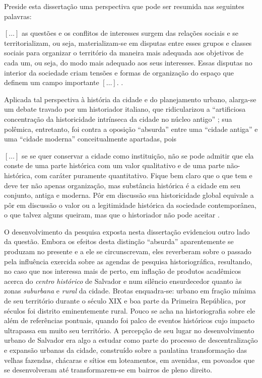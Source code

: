 Preside esta dissertação uma perspectiva que pode ser resumida nas seguintes palavras:

\begin{citacao}
\([\dots]\) as questões e os conflitos de interesses surgem das relações sociais e se territorializam, ou seja, materializam-se em disputas entre esses grupos e classes sociais para organizar o território da maneira mais adequada aos objetivos de cada um, ou seja, do modo mais adequado aos seus interesses. Essas disputas no interior da sociedade criam tensões e formas de organização do espaço que definem um campo importante \([\dots]\). \cite[p.~41]{CASTRO2005}.
\end{citacao}

Aplicada tal perspectiva à história da cidade e do planejamento urbano, alarga-se um debate travado por um historiador italiano, que ridicularizou a ``artificiosa concentração da historicidade intrínseca da cidade no núcleo antigo'' \cite[p.~74]{argan_histcid_1992}; sua polêmica, entretanto, foi contra a oposição ``absurda'' entre uma ``cidade antiga'' e uma ``cidade moderna'' conceitualmente apartadas, pois 

\begin{citacao}
\([\dots]\) se se quer conservar a cidade como instituição, não se pode admitir que ela conste de uma parte histórica com um valor qualitativo e de uma parte não-histórica, com caráter puramente quantitativo. Fique bem claro que o que tem e deve ter não apenas organização, mas substância histórica é a cidade em seu conjunto, antiga e moderna. Pôr em discussão sua historicidade global equivale a pôr em discussão o valor ou a legitimidade histórica da sociedade contemporânea, o que talvez alguns queiram, mas que o historiador não pode aceitar \cite[p.~79]{argan_histcid_1992}.
\end{citacao}

O desenvolvimento da pesquisa exposta nesta dissertação evidenciou outro lado da questão. Embora os efeitos desta distinção ``absurda'' aparentemente se produzam no presente e a ele se circunscrevam, eles reverberam sobre o passado pela influência exercida sobre as agendas de pesquisa historiográfica, resultando, no caso que nos interessa mais de perto, em inflação de produtos acadêmicos acerca do \textit{centro histórico} de Salvador e num silêncio ensurdecedor quanto às zonas \textit{suburbana} e \textit{rural} da cidade. Brotas enquadra-se: urbano em fração mínima de seu território durante o século XIX e boa parte da Primeira República, por séculos foi distrito eminentemente rural. Pouco se acha na historiografia sobre ele além de referências pontuais, quando foi palco de eventos históricos cujo impacto ultrapassa em muito seu território. A percepção de seu lugar no desenvolvimento urbano de Salvador era algo a estudar como parte do processo de descentralização e expansão urbanas da cidade, construído sobre a paulatina transformação das velhas fazendas, chácaras e sítios em loteamentos, em avenidas, em povoados que se desenvolveram até transformarem-se em bairros de pleno direito.

